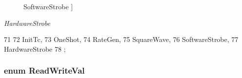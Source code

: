 \begin{Desc}
\begin{description}
{\hypertarget{classIntel8254Timer_ade72aac01b93a533c67f2d838380f169a640b1a596038afefb7a68e225ad4a636}{
SoftwareStrobe}
\label{classIntel8254Timer_ade72aac01b93a533c67f2d838380f169a640b1a596038afefb7a68e225ad4a636}
}]\item[{\em 
\hypertarget{classIntel8254Timer_ade72aac01b93a533c67f2d838380f169a404427193131b86eafc33e4a85bf36e3}{
HardwareStrobe}
\label{classIntel8254Timer_ade72aac01b93a533c67f2d838380f169a404427193131b86eafc33e4a85bf36e3}
}]\end{description}
\end{Desc}




\begin{DoxyCode}
71                  {
72         InitTc,
73         OneShot,
74         RateGen,
75         SquareWave,
76         SoftwareStrobe,
77         HardwareStrobe
78     };
\end{DoxyCode}
\hypertarget{classIntel8254Timer_aed053e10f24c359c1ea7b060a714339f}{
\subsubsection[{ReadWriteVal}]{\setlength{\rightskip}{0pt plus 5cm}enum {\bf ReadWriteVal}}}
\label{classIntel8254Timer_aed053e10f24c359c1ea7b060a714339f}
